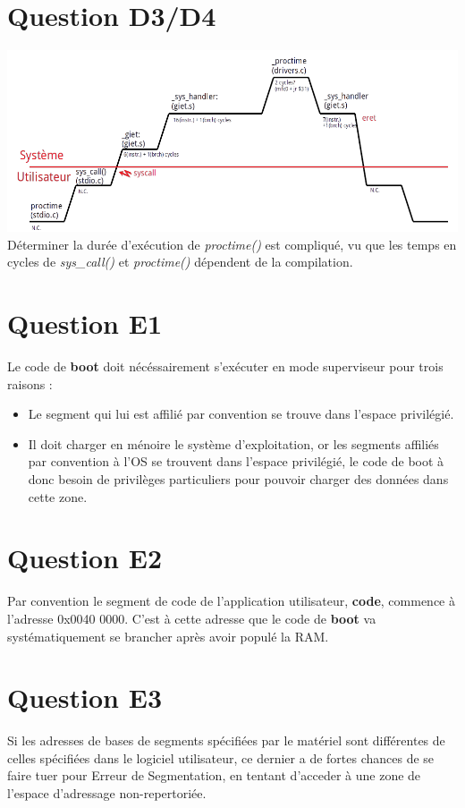 \documentclass[10pt]{article}
\begin{document}
\section{Question D3/D4}
\includegraphics[width=18cm]{chrono.png}\\
Déterminer la durée d'exécution de {\it proctime()} est compliqué, vu que les temps
en cycles de {\it sys\_call()} et {\it proctime()} dépendent de la compilation.

\section{Question E1}
Le code de {\bf boot} doit nécéssairement s'exécuter en mode superviseur pour
trois raisons :
\begin{itemize}
  \item Le segment qui lui est affilié par convention se trouve dans l'espace
  privilégié.
  \item Il doit charger en ménoire le système d'exploitation, or les segments
  affiliés par convention à l'OS se trouvent dans l'espace privilégié, le code
  de boot à donc besoin de privilèges particuliers pour pouvoir charger des
  données dans cette zone.
\end{itemize}

\section{Question E2}
Par convention le segment de code de l'application utilisateur, {\bf code},
commence à l'adresse 0x0040 0000. C'est à cette adresse que le code de {\bf boot}
va systématiquement se brancher après avoir populé la RAM.

\section{Question E3}
Si les adresses de bases de segments spécifiées par le matériel sont différentes
de celles spécifiées dans le logiciel utilisateur, ce dernier a de fortes chances
de se faire tuer pour Erreur de Segmentation, en tentant d'acceder à une zone de
l'espace d'adressage non-repertoriée.
\end{document}
